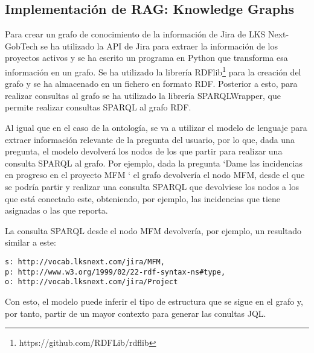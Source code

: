 \subsection{Implementación de RAG: Knowledge Graphs}
 Para crear un grafo de conocimiento de la información de Jira de LKS Next-GobTech se ha utilizado la API de Jira para extraer la información de los proyectos activos y se ha escrito un programa en Python que transforma esa información en un grafo. Se ha utilizado la librería RDFlib\footnote{https://github.com/RDFLib/rdflib} para la creación del grafo y se ha almacenado en un fichero en formato RDF. Posterior a esto, para realizar consultas al grafo se ha utilizado la librería SPARQLWrapper, que permite realizar consultas SPARQL al grafo RDF.

Al igual que en el caso de la ontología, se va a utilizar el modelo de lenguaje para extraer información relevante de la pregunta del usuario, por lo que, dada una pregunta, el modelo devolverá los nodos de los que partir para realizar una consulta SPARQL al grafo. Por ejemplo, dada la pregunta `Dame las incidencias en progreso en el proyecto MFM ` el grafo devolvería el nodo MFM, desde el que se podría partir y realizar una consulta SPARQL que devolviese los nodos a los que está conectado este, obteniendo, por ejemplo, las incidencias que tiene asignadas o las que reporta.

La consulta SPARQL desde el nodo MFM devolvería, por ejemplo, un resultado similar a este:
\begin{small}
\begin{verbatim}
s: http://vocab.lksnext.com/jira/MFM, 
p: http://www.w3.org/1999/02/22-rdf-syntax-ns#type, 
o: http://vocab.lksnext.com/jira/Project
\end{verbatim}
\end{small}

Con esto, el modelo puede inferir el tipo de estructura que se sigue en el grafo y, por tanto, partir de un mayor contexto para generar las conultas JQL.